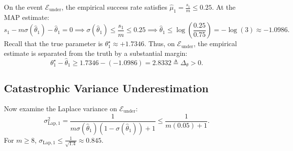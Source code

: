 \documentclass[twoside]{article}
\begin{document}
On the event $\mathcal{E}_{\text{under}}$, the empirical success rate satisfies $\hat{\mu}_1 = \frac{s_1}{m} \le 0.25$. At the MAP estimate:
\begin{equation}
s_1 - m \sigma(\hat{\theta}_1) - \hat{\theta}_1 = 0 \implies \sigma(\hat{\theta}_1) \le \frac{s_1}{m} \le 0.25 \implies \hat{\theta}_1 \le \log\left(\frac{0.25}{0.75}\right) = -\log(3) \approx -1.0986.
\end{equation}
Recall that the true parameter is $\theta_1^\star \approx +1.7346$. Thus, on $\mathcal{E}_{\text{under}}$, the empirical estimate is separated from the truth by a substantial margin:
\begin{equation}
\theta_1^\star - \hat{\theta}_1 \ge 1.7346 - (-1.0986) = 2.8332 \triangleq \Delta_\theta > 0.
\end{equation}

\subsection{Catastrophic Variance Underestimation}
Now examine the Laplace variance on $\mathcal{E}_{\text{under}}$:
\begin{equation}
\sigma_{\text{Lap}, 1}^2 = \frac{1}{m \sigma(\hat{\theta}_1)(1 - \sigma(\hat{\theta}_1)) + 1} \le \frac{1}{m (0.05) + 1}.
\end{equation}
For $m \ge 8$, $\sigma_{\text{Lap}, 1} \le \frac{1}{\sqrt{1.4}} \approx 0.845$.
\end{document}
